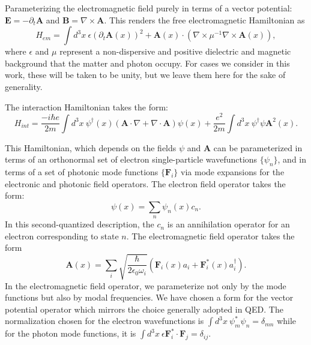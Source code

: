 \documentclass[aps,prb,onecolumn,
	groupedaddress,superscriptaddress,
	amsfonts,amssymb,amsmath,floatfix,
	citeautoscript]{revtex4-1}
\begin{document}
Parameterizing the electromagnetic field purely in terms of a vector potential: $\mathbf{E} = -\partial_t\mathbf{A}$ and $\mathbf{B} = \nabla\times\mathbf{A}$. This renders the free electromagnetic Hamiltonian as
\begin{equation}
H_{em} = \int d^3x~ \epsilon (\partial_t \mathbf{A}(x))^2 + \mathbf{A}(x)\cdot(\nabla\times\mu^{-1}\nabla\times\mathbf{A}(x)),
\end{equation}
where $\epsilon$ and $\mu$ represent a non-dispersive and positive dielectric and magnetic background that the matter and photon occupy. For cases we consider in this work, these will be taken to be unity, but we leave them here for the sake of generality.

The interaction Hamiltonian takes the form:
\begin{equation}
H_{int} = \frac{-i\hbar e}{2m}\int d^3x ~\psi^{\dagger}(x)(\mathbf{A}\cdot\nabla +  \nabla \cdot \mathbf{A})\psi(x) + \frac{e^2}{2m}\int d^3x ~\psi^{\dagger}\psi\mathbf{A}^2(x).
\end{equation}

This Hamiltonian, which depends on the fields $\psi$ and $\mathbf{A}$ can be parameterized in terms of an orthonormal set of electron single-particle wavefunctions $\{\psi_n\}$, and in terms of a set of photonic mode functions $\{\mathbf{F}_i\}$ via mode expansions for the electronic and photonic field operators. The electron field operator takes the form:
\begin{equation}
\psi(x) = \sum_n \psi_n(x)c_n.
\end{equation}
In this second-quantized description, the $c_n$ is an annihilation operator for an electron corresponding to state $n$. The electromagnetic field operator takes the form
\begin{equation}
\mathbf{A}(x) = \sum_i\sqrt{\frac{\hbar}{2\epsilon_0\omega_i}} \left(\mathbf{F}_i(x)a_i+\mathbf{F}^*_i(x)a^{\dagger}_i\right).
\end{equation}
In the electromagnetic field operator, we parameterize not only by the mode functions but also by modal frequencies. We have chosen a form for the vector potential operator which mirrors the choice generally adopted in QED. The normalization chosen for the electron wavefunctions is $\int d^3x~ \psi_m^*\psi_n = \delta_{mn}$ while for the photon mode functions, it is $\int d^3x~\epsilon\mathbf{F}_i^*\cdot\mathbf{F}_j = \delta_{ij}.$
\end{document}
